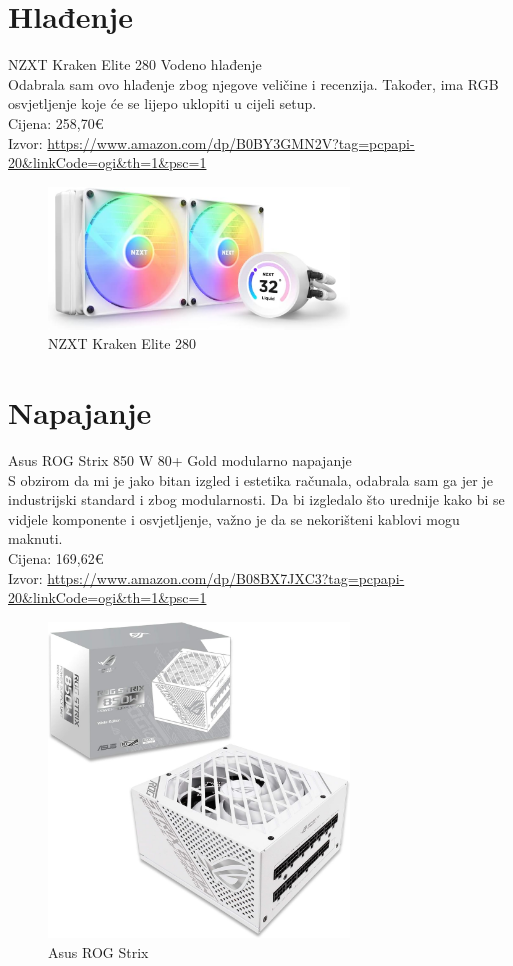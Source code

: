 \documentclass{report}
\begin{document}
\chapter{Hlađenje}
NZXT Kraken Elite 280 Vodeno hlađenje
\\ Odabrala sam ovo hlađenje zbog njegove veličine i recenzija. Također, ima RGB osvjetljenje koje će se lijepo uklopiti u cijeli setup.
\\Cijena: 258,70€
\\Izvor:  \url{https://www.amazon.com/dp/B0BY3GMN2V?tag=pcpapi-20&linkCode=ogi&th=1&psc=1}
\begin{figure}[h]
\includegraphics[width=8cm]{slike/hladnjak.jpg}
\caption{NZXT Kraken Elite 280}
\end{figure}

\chapter{Napajanje}
Asus ROG Strix 850 W 80+ Gold modularno napajanje
\\ S obzirom da mi je jako bitan izgled i estetika računala, odabrala sam ga jer je industrijski standard i zbog modularnosti. Da bi izgledalo što urednije kako bi se vidjele komponente i osvjetljenje, važno je da se nekorišteni kablovi mogu maknuti.
\\Cijena: 169,62€
\\Izvor:  \url{https://www.amazon.com/dp/B08BX7JXC3?tag=pcpapi-20&linkCode=ogi&th=1&psc=1}
\begin{figure}[h]
\includegraphics[width=8cm]{napajanje.jpg}
\caption{Asus ROG Strix}
\end{figure}
\end{document}
